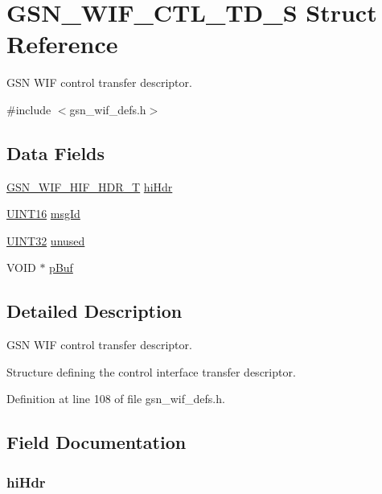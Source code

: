 \hypertarget{a00322}{
\section{GSN\_\-WIF\_\-CTL\_\-TD\_\-S Struct Reference}
\label{a00322}
}


GSN WIF control transfer descriptor.  




{\ttfamily \#include $<$gsn\_\-wif\_\-defs.h$>$}

\subsection*{Data Fields}
\begin{DoxyCompactItemize}
\item 
\hyperlink{a00337}{GSN\_\-WIF\_\-HIF\_\-HDR\_\-T} \hyperlink{a00322_ad9d6e8525242b101d86e51ace71914d3}{hiHdr}
\item 
\hyperlink{a00660_ga09f1a1fb2293e33483cc8d44aefb1eb1}{UINT16} \hyperlink{a00322_aab6e2534fa56ef9bb0cd6fc1e781efd3}{msgId}
\item 
\hyperlink{a00660_gae1e6edbbc26d6fbc71a90190d0266018}{UINT32} \hyperlink{a00322_a2c3ace150ddcb10d297a6d30b67d6330}{unused}
\item 
VOID $\ast$ \hyperlink{a00322_ae73880d96d570d584a107c2b4ef84584}{pBuf}
\end{DoxyCompactItemize}


\subsection{Detailed Description}
GSN WIF control transfer descriptor. 

Structure defining the control interface transfer descriptor. 

Definition at line 108 of file gsn\_\-wif\_\-defs.h.



\subsection{Field Documentation}
\hypertarget{a00322_ad9d6e8525242b101d86e51ace71914d3}{
\subsubsection[{hiHdr}]{ {\bf hiHdr}}}
\label{a00322_ad9d6e8525242b101d86e51ace71914d3}


